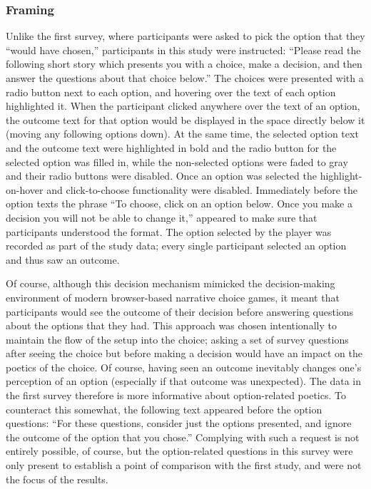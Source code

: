 \subsubsection{Framing}

Unlike the first survey, where participants were asked to pick the option that they ``would have chosen,'' participants in this study were instructed:
%
``Please read the following short story which presents you with a choice, make a decision, and then answer the questions about that choice below.''
%
The choices were presented with a radio button next to each option, and hovering over the text of each option highlighted it.
%
When the participant clicked anywhere over the text of an option, the outcome text for that option would be displayed in the space directly below it (moving any following options down).
%
At the same time, the selected option text and the outcome text were highlighted in bold and the radio button for the selected option was filled in, while the non-selected options were faded to gray and their radio buttons were disabled.
%
Once an option was selected the highlight-on-hover and click-to-choose functionality were disabled.
%
Immediately before the option texts the phrase ``To choose, click on an option below. Once you make a decision you will not be able to change it,'' appeared to make sure that participants understood the format.
%
The option selected by the player was recorded as part of the study data; every single participant selected an option and thus saw an outcome.


Of course, although this decision mechanism mimicked the decision-making environment of modern browser-based narrative choice games, it meant that participants would see the outcome of their decision before answering questions about the options that they had.
%
This approach was chosen intentionally to maintain the flow of the setup into the choice; asking a set of survey questions after seeing the choice but before making a decision would have an impact on the poetics of the choice.
%
Of course, having seen an outcome inevitably changes one's perception of an option (especially if that outcome was unexpected).
%
The data in the first survey therefore is more informative about option-related poetics.
%
To counteract this somewhat, the following text appeared before the option questions:
%
``For these questions, consider just the options presented, and ignore the outcome of the option that you chose.''
%
Complying with such a request is not entirely possible, of course, but the option-related questions in this survey were only present to establish a point of comparison with the first study, and were not the focus of the results.


